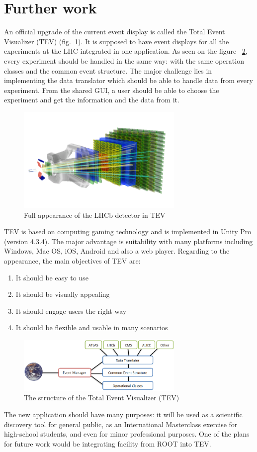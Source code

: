 \documentclass[3p,times,twocolumn]{elsarticle}
\begin{document}
\section{Further work}
An official upgrade of the current event display is called the Total Event Visualizer (TEV) (fig.~\ref{o2}). It is supposed to have event displays for all the experiments at the LHC integrated in one application. As seen on the figure ~\ref{o1}, every experiment should be handled in the same way: with the same operation classes and the common event structure. The major challenge lies in implementing the data translator which should be able to handle data from every experiment. From the shared GUI, a user should be able to choose the experiment and get the information and the data from it.\par
\begin{figure}[ht!]
	\centering
	\includegraphics[width=80mm]{2r6l6zd.png}
	\caption{Full appearance of the LHCb detector in TEV \label{o2}}
\end{figure}
TEV is based on computing gaming technology and is implemented in Unity Pro (version 4.3.4). The major advantage is suitability with many platforms including Windows, Mac OS, iOS, Android and also a web player. Regarding to the appearance, the main objectives of TEV are: 
\begin{enumerate}
	  \item It should be easy to use
	  \item It should be visually appealing
	  \item It should engage users the right way
	  \item It should be flexible and usable in many scenarios
\end{enumerate}
\begin{figure}[ht!]
	\centering
	\includegraphics[width=80mm]{2u4r5es.png}
	\caption{The structure of the Total Event Visualizer (TEV)\label{o1}}
\end{figure}
The new application should have many purposes: it will be used as a scientific discovery tool for general public, as an International Masterclass exercise for high-school students, and even for minor professional purposes. One of the plans for future work would be integrating facility from ROOT into TEV.
\end{document}
